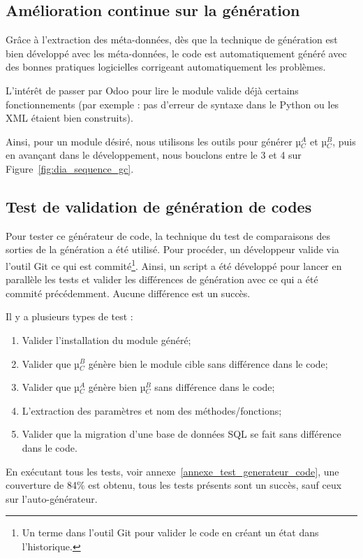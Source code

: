 \subsection {Amélioration continue sur la génération}

Grâce à l’extraction des méta-données, dès que la technique de génération est bien développé avec les méta-données, le code est automatiquement généré avec des bonnes pratiques logicielles corrigeant automatiquement les problèmes.

L’intérêt de passer par Odoo pour lire le module valide déjà certains fonctionnements (par exemple : pas d’erreur de syntaxe dans le Python ou les XML étaient bien construits).

Ainsi, pour un module désiré, nous utilisons les outils pour générer µ$_C^A$ et µ$_C^B$, puis en avançant dans le développement, nous bouclons entre le 3 et 4 sur Figure~\ref{fig:dia_sequence_gc}.

\subsection {Test de validation de génération de codes}\label{test_validation_generation_code_resultat}

Pour tester ce générateur de code, la technique du test de comparaisons des sorties de la génération a été utilisé. Pour procéder, un développeur valide via l'outil Git ce qui est commité\footnote{Un terme dans l'outil Git pour valider le code en créant un état dans l'historique.}. Ainsi, un script a été développé pour lancer en parallèle les tests et valider les différences de génération avec ce qui a été commité précédemment. Aucune différence est un succès.

Il y a plusieurs types de test : 
\begin{enumerate}
    \item Valider l’installation du module généré;
    \item Valider que µ$_C^B$ génère bien le module cible sans différence dans le code;
    \item Valider que µ$_C^A$ génère bien µ$_C^B$ sans différence dans le code;
    \item L’extraction des paramètres et nom des méthodes/fonctions;
    \item Valider que la migration d’une base de données SQL se fait sans différence dans le code.
\end{enumerate}

En exécutant tous les tests, voir annexe~\ref{annexe_test_generateur_code}, une couverture de 84\% est obtenu, tous les tests présents sont un succès, sauf ceux sur l’auto-générateur.

